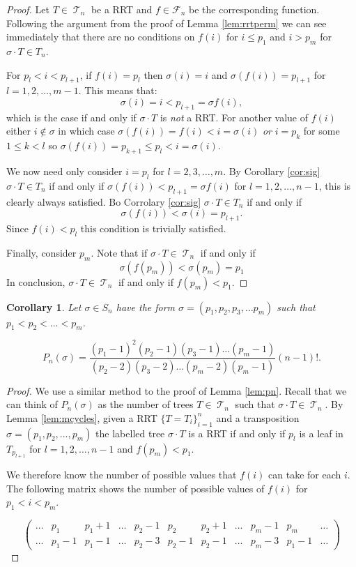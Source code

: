 \documentclass[10pt]{amsart} %
\newtheorem{corol}{Corollary}
\theoremstyle{definition}
\DeclareMathOperator{\T}{\mathcal{T}}
\begin{document}
\begin{proof}
Let $T \in \T_n$ be a RRT and $f \in \mathcal{F}_n$ be the corresponding function. Following the argument from the proof of Lemma \ref{lem:rrtperm} we can see immediately that there are no conditions on $f(i)$ for $i \leq p_1$ and $i > p_m$ for $\sigma \cdot T \in T_n$. 

For $p_l < i < p_{l+1}$, if $f(i) = p_l$ then $\sigma(i) = i$ and $\sigma(f(i)) = p_{l+1}$ for $l = 1,2,\dots, m-1$.  This means that:
\[\sigma(i) = i < p_{l+1}  = \sigma{f(i)},\]
which is the case if and only if $\sigma \cdot T$ is \emph{not} a RRT. For another value of $f(i)$ either $i \notin \sigma$ in which case $\sigma(f(i)) =  f(i) < i = \sigma(i)$ \emph{or} $i = p_k$ for some $1 \leq k <l$ so $\sigma(f(i)) = p_{k+1} \leq p_l < i = \sigma(i)$.   

We now need only consider $i = p_l$ for $l = 2,3,\dots,m$. By Corollary \ref{cor:sig} $\sigma \cdot T \in T_n$ if and only if $\sigma(f(i)) < p_{l+1}  = \sigma{f(i)}$ for  $l = 1,2,\dots, n-1$, this is clearly always satisfied.  Bo Corrolary \ref{cor:sig} $\sigma \cdot T \in T_n$ if and only if
\[ \sigma(f(i)) < \sigma(i) = p_{l+1}.\]
Since $f(i) < p_l$ this condition is trivially satisfied. 


Finally, consider $p_m$.  Note that if $\sigma \cdot T \in \T_n$ if and only if 
\[\sigma(f(p_m)) < \sigma(p_m) = p_1\]
In conclusion, $\sigma \cdot T \in \T_n$ if and only if $f(p_m) < p_1$.  

\end{proof}
\begin{corol}
  Let $\sigma \in S_n$ have the form $\sigma = (p_1,p_2,p_3,\dots p_m)$ such that $p_1 < p_2 < \dots < p_m$.  
  
  \[P_n(\sigma) = \frac{(p_1-1)^{2}(p_2 -1)(p_3-1)\dots(p_m -1)}{(p_2 - 2)(p_3 - 2)\dots(p_m-2)(p_m-1)} (n-1)!.\] 

  \end{corol}
\begin{proof}
 We use a similar method to the proof of Lemma \ref{lem:pn}.  Recall that we can think of $P_n(\sigma)$  as the number of trees $T \in \T_n$ such that $\sigma \cdot T \in \T_n$. By Lemma \ref{lem:mcycles}, given a RRT $\{T = T_{i}\}_{i=1}^{n}$ and a transposition $\sigma  = (p_1,p_2,\dots,p_m)$ the labelled tree $\sigma  \cdot T$ is a RRT if and only if  $p_l$ is a leaf in $T_{p_{l+1}}$ for $l = 1,2,\dots,n-1$ and $f(p_m) < p_1$.  

We therefore know the number of possible values that $f(i)$ can take for each $i$. The following matrix shows the number of possible values of $f(i)$ for $p_1 < i < p_m$. 

 \[\left(\begin{array}{ccccccccccc}
     \dots & p_1      & p_1 +1   & \dots & p_2 - 1 & p_2   & p_2 + 1 & \dots & p_m - 1 & p_m & \dots \\
     \dots & p_1 - 1  & p_1 - 1  & \dots & p_2 - 3 & p_2-1 & p_2-1   & \dots & p_m-3   & p_1-1 & \dots  
    \end{array} \right)
\]
\end{proof}
 
\end{document}
